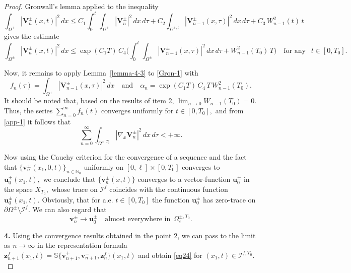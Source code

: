 \documentclass[reqno]{amsart}            %
\numberwithin{equation}{section}
\begin{document}
\begin{proof}
		Gronwall’s lemma applied to the inequality
		$$
		\int_{\Omega^\pm} |\mathbf{V}^\pm_n(x,t)|^2\, dx \le C_1 \int_{0}^{t}\int_{\Omega^\pm} |\mathbf{V}^\pm_n|^2 \, dx\, d\tau 
		+  C_2 \int_{\Omega^{\pm, t}} |\mathbf{V}^\pm_{n-1}(x,\tau)|^2 \, dx\, d\tau + C_3 \, W^2_{n-1}(t) \, t
		$$
		gives the estimate
		\begin{equation}\label{Gron-1}
			\int_{\Omega^\pm} |\mathbf{V}^\pm_n(x,t)|^2\, dx \le \exp(C_1 T) \, C_4 \Big(\int_{0}^{t}\int_{\Omega^\pm} |\mathbf{V}^\pm_{n-1}(x,\tau)|^2 \, dx\, d\tau + W^2_{n-1}(T_0) \, T \Big) \quad \text{for any } \ \ t \in [0,T_0]. 
		\end{equation}
		
		Now, it remains to apply Lemma~\ref{lemma-4-3} to \eqref{Gron-1} with  
		$$
		f_n(\tau) = \int_{\Omega^\pm} |\mathbf{V}^\pm_{n-1}(x,\tau)|^2 \, dx \quad \text{and} \quad  \alpha_n = 
		\exp(C_1 T) \, C_4 \, T \, W^2_{n-1}(T_0).
		$$ 
		It should be noted that, based on the results of item 2, $\lim_{n\to 0}W_{n-1}(T_0)= 0.$ 
		Thus, the series $\sum_{n=0}^{\infty} f_n(t) $ converges uniformly for $t\in[0,T_0],$ and from \eqref{app-1} it follows that
		$$
		\sum_{n=0}^{\infty} \int_{\Omega^{\pm, T_0}} |\nabla_x \mathbf{V}^\pm_n|^2 \, dx\, d\tau < +\infty .
		$$   
		
		
		Now using the Cauchy criterion for the convergence of a sequence and the fact that $\{\mathbf{v}^\pm_n(x_1, 0, t)\}_{n\in \mathbb N_0}$ uniformly on $[0, \ell] \times [0, T_0]$ converges to $\mathbf{u}^\pm_0(x_1, t),$ we conclude that 
		$\{\mathbf{v}^\pm_n(x, t)\}$ converges to a vector-function $\mathbf{u}^\pm_0$
		in the space $X_{T_0},$  whose trace on $\mathcal{I}^f$ coincides with
		the continuous function $\mathbf{u}^\pm_0(x_1, t).$ Obviously, that for a.e. $t\in [0,T_0]$ the function  $\mathbf{u}^\pm_0$ has zero-trace on $\partial\Omega^\pm \setminus \mathcal{I}^f.$ We can also regard that
		\begin{equation}\label{conv4}
			\mathbf{v}^\pm_n    \rightarrow  \mathbf{u}^\pm_0 \quad \text{almost everywhere in} \ \ \Omega_\varepsilon^{\pm, T_0}.
		\end{equation}
		
		
		\smallskip
		\noindent
		{\bf 4.} Using the convergence results obtained in the point 2, we can pass to the limit as $n\to \infty$ in the representation 
		formula $\mathbf{z}^f_{n+1}(x_1,t) = \mathbb{S}\{\mathbf{v}^+_{n+1}, \mathbf{v}^-_{n+1},\mathbf{z}^f_n\}(x_1,t)$ 
		and obtain \eqref{eq24} for $(x_1, t) \in \mathcal{I}^{f, T_0}.$
		

\end{proof}
\end{document}
